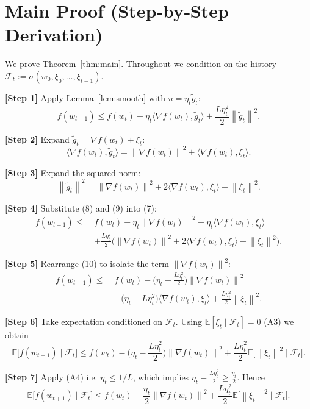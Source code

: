 \documentclass[11pt]{article}
\newcommand{\EE}{\mathbb{E}}
\newcommand{\norm}[1]{\left\lVert #1 \right\rVert}
\begin{document}
\section*{Main Proof (Step‑by‑Step Derivation)}
We prove Theorem~\ref{thm:main}. Throughout we condition on the history
$\mathcal F_t:=\sigma(w_0,\xi_0,\dots,\xi_{t-1})$.

\noindent\textbf{[Step 1]} Apply Lemma~\ref{lem:smooth} with
$u=\eta_t\tilde g_t$:
\[
f(w_{t+1})\le f(w_t)-\eta_t\langle\nabla f(w_t),\tilde g_t\rangle
+\frac{L\eta_t^{2}}{2}\norm{\tilde g_t}^{2}.
\tag{7}
\]

\noindent\textbf{[Step 2]} Expand $\tilde g_t = \nabla f(w_t)+\xi_t$:
\[
\langle\nabla f(w_t),\tilde g_t\rangle
= \norm{\nabla f(w_t)}^{2}
+ \langle\nabla f(w_t),\xi_t\rangle .
\tag{8}
\]

\noindent\textbf{[Step 3]} Expand the squared norm:
\[
\norm{\tilde g_t}^{2}
= \norm{\nabla f(w_t)}^{2}
+2\langle\nabla f(w_t),\xi_t\rangle
+\norm{\xi_t}^{2}.
\tag{9}
\]

\noindent\textbf{[Step 4]} Substitute (8) and (9) into (7):
\[
\begin{aligned}
f(w_{t+1}) \le\;& f(w_t)
-\eta_t\norm{\nabla f(w_t)}^{2}
-\eta_t\langle\nabla f(w_t),\xi_t\rangle \\
&+\frac{L\eta_t^{2}}{2}
\Big(\norm{\nabla f(w_t)}^{2}
+2\langle\nabla f(w_t),\xi_t\rangle
+\norm{\xi_t}^{2}\Big).
\end{aligned}
\tag{10}
\]

\noindent\textbf{[Step 5]} Rearrange (10) to isolate the term
$\norm{\nabla f(w_t)}^{2}$:
\[
\begin{aligned}
f(w_{t+1}) \le\;& f(w_t)
-\Big(\eta_t-\frac{L\eta_t^{2}}{2}\Big)\norm{\nabla f(w_t)}^{2} \\
&-\Big(\eta_t-\!L\eta_t^{2}\Big)\langle\nabla f(w_t),\xi_t\rangle
+\frac{L\eta_t^{2}}{2}\norm{\xi_t}^{2}.
\end{aligned}
\tag{11}
\]

\noindent\textbf{[Step 6]} Take expectation conditioned on $\mathcal F_t$.
Using $\EE[\xi_t\mid\mathcal F_t]=0$ (A3) we obtain
\[
\EE\!\big[f(w_{t+1})\mid\mathcal F_t\big]
\le f(w_t)
-\Big(\eta_t-\frac{L\eta_t^{2}}{2}\Big)\norm{\nabla f(w_t)}^{2}
+\frac{L\eta_t^{2}}{2}\EE\!\big[\norm{\xi_t}^{2}\mid\mathcal F_t\big].
\tag{12}
\]

\noindent\textbf{[Step 7]} Apply (A4) i.e. $\eta_t\le 1/L$, which implies
$\eta_t-\frac{L\eta_t^{2}}{2}\ge \frac{\eta_t}{2}$. Hence
\[
\EE\!\big[f(w_{t+1})\mid\mathcal F_t\big]
\le f(w_t)
-\frac{\eta_t}{2}\norm{\nabla f(w_t)}^{2}
+\frac{L\eta_t^{2}}{2}\EE\!\big[\norm{\xi_t}^{2}\mid\mathcal F_t\big].
\tag{13}
\]
\end{document}
